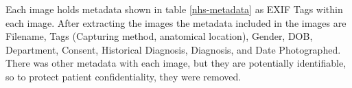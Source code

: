 
Each image holds metadata shown in table \ref{nhs-metadata} as EXIF Tags within each image. After extracting the images the metadata included in the images are Filename, Tags (Capturing method, anatomical location), Gender, DOB, Department, Consent, Historical Diagnosis, Diagnosis, and Date Photographed. There was other metadata with each image, but they are potentially identifiable, so to protect patient confidentiality, they were removed.

